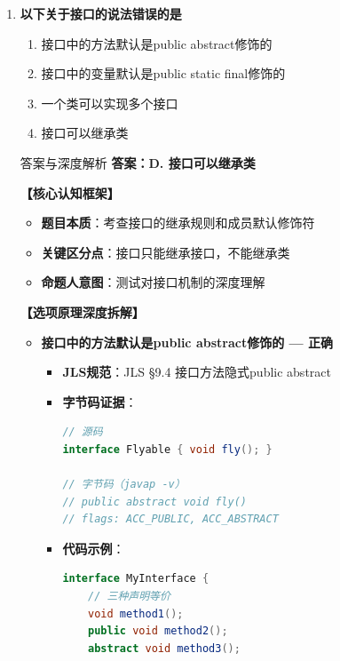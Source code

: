 \documentclass[12pt, a4paper]{ctexart}
\begin{document}
\begin{enumerate}[label=\textbf{\arabic*.}]
\begin{bluebox}{答案与深度解析}
		      \textbf{【命题趋势与实战策略】}

		      \textbf{5秒决策技巧}：看到"定义接口"→interface
	      \end{bluebox}

	\item \textbf{以下关于接口的说法错误的是}
	      \begin{enumerate}[label=\Alph*.]
		      \item 接口中的方法默认是public abstract修饰的
		      \item 接口中的变量默认是public static final修饰的
		      \item 一个类可以实现多个接口
		      \item 接口可以继承类
	      \end{enumerate}

	      \begin{bluebox}{答案与深度解析}
		      \textbf{答案：D. 接口可以继承类}

		      \textbf{【核心认知框架】}
		      \begin{itemize}[label={}, leftmargin=*, nosep]
			      \item \textbf{题目本质}：考查接口的继承规则和成员默认修饰符
			      \item \textbf{关键区分点}：接口只能继承接口，不能继承类
			      \item \textbf{命题人意图}：测试对接口机制的深度理解
		      \end{itemize}

		      \textbf{【选项原理深度拆解】}

		      \begin{itemize}[leftmargin=*, nosep, label={}]
			      \item[A] \textbf{接口中的方法默认是public abstract修饰的 — 正确}
			            \begin{itemize}[label={}, leftmargin=*, nosep]
				            \item \textbf{JLS规范}：JLS §9.4 接口方法隐式public abstract
				            \item \textbf{字节码证据}：
				                  \begin{lstlisting}[language=Java]
// 源码
interface Flyable { void fly(); }

// 字节码（javap -v）
// public abstract void fly()
// flags: ACC_PUBLIC, ACC_ABSTRACT
						      \end{lstlisting}
				            \item \textbf{代码示例}：
				                  \begin{lstlisting}[language=Java]
interface MyInterface {
    // 三种声明等价
    void method1();
    public void method2();
    abstract void method3();


\end{lstlisting}
\end{itemize}
\end{itemize}
\end{bluebox}
\end{enumerate}
\end{document}
